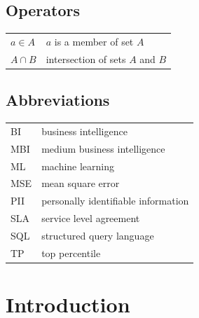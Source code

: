 \documentclass[english,12pt,a4paper,pdftex,sci,utf8]{aaltothesis}
\theoremstyle{definition}
\begin{document}
\subsection*{Operators}

\begin{tabular}{ll}
$a \in A$    & $a$ is a member of set $A$ \\
$A \cap B$   & intersection of sets $A$ and $B$ \\
\end{tabular}

\subsection*{Abbreviations}

\begin{tabular}{ll}
BI          & business intelligence \\
MBI         & medium business intelligence \\
ML          & machine learning \\
MSE         & mean square error \\
PII         & personally identifiable information \\
SLA         & service level agreement \\
SQL         & structured query language \\
TP          & top percentile \\
\end{tabular}


\cleardoublepage
\storeinipagenumber
{}
\setcounter{page}{1}


\section{Introduction}
\thispagestyle{empty}
\end{document}
